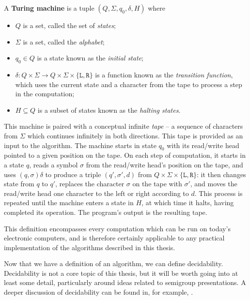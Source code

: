\begin{definition}
  \label{def:turing-machine}
  A \textbf{Turing machine} is a tuple $(Q, \Sigma, q_0, \delta, H)$ where
  \begin{itemize}
  \item $Q$ is a set, called the set of \textit{states};
  \item $\Sigma$ is a set, called the \textit{alphabet};
  \item $q_0 \in Q$ is a state known as the \textit{initial state};
  \item $\delta: Q \times \Sigma \to
    Q \times \Sigma \times \{\mathtt{L}, \mathtt{R}\}$
    is a function known as the \textit{transition function}, which uses the
    current state and a character from the tape to process a step in the
    computation;
  \item $H \subseteq Q$ is a subset of states known as the \textit{halting
      states}.
  \end{itemize}
  This machine is paired with a conceptual infinite \textit{tape} -- a
  sequence of characters from $\Sigma$ which continues infinitely in both
  directions.  This tape is provided as an input to the algorithm.  The machine
  starts in state $q_0$ with its read/write head pointed to a given position on
  the tape.  On each step of computation, it starts in a state $q$, reads a
  symbol $\sigma$ from the read/write head's position on the tape, and uses
  $(q, \sigma)\delta$ to produce a triple $(q', \sigma', d)$ from
  $Q \times \Sigma \times \{\mathtt{L},\mathtt{R}\}$:
  it then changes state from $q$ to $q'$,
  replaces the character $\sigma$ on the tape with $\sigma'$, and moves the
  read/write head one character to the left or right according to $d$.  This process is
  repeated until the machine enters a state in $H$, at which time it halts,
  having completed its operation.  The program's output is the resulting tape.
\end{definition}

This definition encompasses every computation which can be run on today's
electronic computers, and is therefore certainly applicable to any practical
implementation of the algorithms described in this thesis.

Now that we have a definition of an algorithm, we can define decidability.
Decidability is not a core topic of this thesis, but it will be worth going into
at least some detail, particularly around ideas related to semigroup
presentations.  A deeper discussion of decidability can be found in, for
example, \cite{enderton_2001}.

